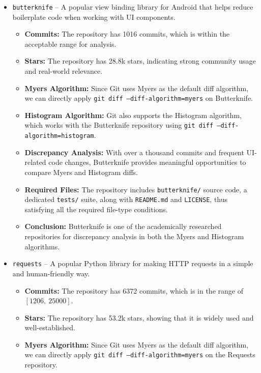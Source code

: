 \documentclass[12pt, a4paper]{report}
\begin{document}
\begin{itemize}
    \item \texttt{butterknife} -- A popular view binding library for Android that helps reduce boilerplate code when working with UI components.  
        \begin{itemize}
            \item \textbf{Commits:} The repository has 1016 commits, which is within the acceptable range for analysis.
            \item \textbf{Stars:} The repository has 28.8k stars, indicating strong community usage and real-world relevance.  
            \item \textbf{Myers Algorithm:} Since Git uses Myers as the default diff algorithm, we can directly apply \texttt{git diff --diff-algorithm=myers} on Butterknife.  
            \item \textbf{Histogram Algorithm:} Git also supports the Histogram algorithm, which works with the Butterknife repository using \texttt{git diff --diff-algorithm=histogram}.  
            \item \textbf{Discrepancy Analysis:} With over a thousand commits and frequent UI-related code changes, Butterknife provides meaningful opportunities to compare Myers and Histogram diffs.  
            \item \textbf{Required Files:} The repository includes \texttt{butterknife/} source code, a dedicated \texttt{tests/} suite, along with \texttt{README.md} and \texttt{LICENSE}, thus satisfying all the required file-type conditions.  
            \item \textbf{Conclusion:} Butterknife is one of the academically researched repositories for discrepancy analysis in both the Myers and Histogram algorithms.
        \end{itemize}
    \item \texttt{requests} -- A popular Python library for making HTTP requests in a simple and human-friendly way.
        \begin{itemize}
            \item \textbf{Commits:} The repository has 6372 commits, which is in the range of $[1206,\ 25000]$.
            \item \textbf{Stars:} The repository has 53.2k stars, showing that it is widely used and well-established.
            \item \textbf{Myers Algorithm:} Since Git uses Myers as the default diff algorithm, we can directly apply \texttt{git diff --diff-algorithm=myers} on the Requests repository.

\end{itemize}
\end{itemize}
\end{document}

